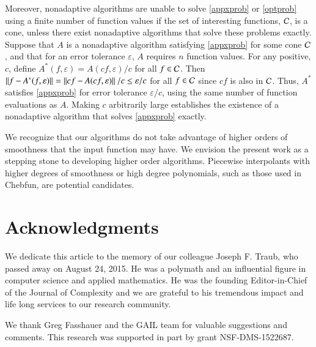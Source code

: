 \documentclass[review]{elsarticle}
\newcommand{\abstol}{\varepsilon}
\theoremstyle{definition}
\begin{document}
Moreover, nonadaptive algorithms are unable to solve \eqref{appxprob} or
\eqref{optprob} using a finite number of function values if the set of
interesting functions, $\mathcal{C}$, is a cone, unless there exist nonadaptive
algorithms that solve these problems exactly. Suppose that $A$ is a nonadaptive
algorithm satisfying \eqref{appxprob} for some cone $\mathcal{C}$, and that for an error
tolerance $\abstol$, $A$ requires $n$ function values. For any positive, $c$,
define $A^*(f,\abstol) = A(cf,\abstol)/c$ for all $f \in \mathcal{C}$. Then $\norm{f -
A^*(f,\abstol)} = \norm{cf - A(cf,\abstol)}/c\le \abstol/c$ for all $f \in \mathcal{C}$
since $cf$ is also in $\mathcal{C}$. Thus, $A^*$ satisfies \eqref{appxprob} for error
tolerance $\abstol/c$, using the same number of function evaluations as $A$.
Making $c$ arbitrarily large establishes the existence of a nonadaptive
algorithm that solves \eqref{appxprob} exactly.

We recognize that our algorithms do not take advantage of higher orders of
smoothness that the input function may have. We envision the present work as a
stepping stone to developing higher order algorithms. Piecewise interpolants
with higher degrees of smoothness or high degree polynomials, such as those used
in Chebfun, are potential candidates.


\section*{Acknowledgments}

We dedicate this article to the memory of our colleague Joseph F. Traub, who
passed away on August 24, 2015. He was a polymath and an influential figure in
computer science and applied mathematics. He was the founding Editor-in-Chief of
the Journal of Complexity and we are grateful to his tremendous impact and life
long services to our research community.

We thank Greg Fasshauer and the GAIL team for
valuable suggestions and comments. This research was supported in part by grant
NSF-DMS-1522687.





\end{document}
